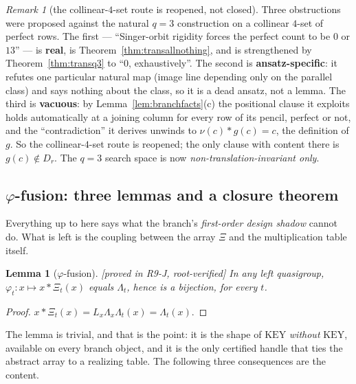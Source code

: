 \documentclass[11pt]{article}
\theoremstyle{plain}
\newtheorem{lemma}[theorem]{Lemma}
\theoremstyle{definition}
\theoremstyle{remark}
\newtheorem*{remark*}{Remark}
\numberwithin{equation}{section}
\newcommand{\op}{\mathbin{*}}
\newcommand{\statusbox}[1]{{\small\sloppy\textsf{[#1]}}}
\newcommand{\PROVED}[1]{\statusbox{proved in #1, root-verified}}
\begin{document}
\begin{remark*}[the collinear-$4$-set route is reopened, not closed]
Three obstructions were proposed against the natural $q = 3$ construction on a
collinear $4$-set of perfect rows. The first --- ``Singer-orbit rigidity forces the
perfect count to be $0$ or $13$'' --- is \textbf{real}, is
Theorem~\ref{thm:transallnothing}, and is strengthened by
Theorem~\ref{thm:transq3} to ``$0$, exhaustively''. The second is
\textbf{ansatz-specific}: it refutes one particular natural map (image line
depending only on the parallel class) and says nothing about the class, so it is a
dead ansatz, not a lemma. The third is \textbf{vacuous}: by
Lemma~\ref{lem:branchfacts}(c) the positional clause it exploits holds
automatically at a joining column for every row of its pencil, perfect or not, and
the ``contradiction'' it derives unwinds to $\nu(c)\op g(c) = c$, the definition of
$g$. So the collinear-$4$-set route is reopened; the only clause with content
there is $g(c)\notin D_r$. The $q = 3$ search space is now
\emph{non-translation-invariant only}.
\end{remark*}

\subsection{$\varphi$-fusion: three lemmas and a closure
theorem}\label{sec:phifusion}

Everything up to here says what the branch's \emph{first-order design shadow}
cannot do. What is left is the coupling between the array $\Xi$ and the
multiplication table itself.

\begin{lemma}[$\varphi$-fusion]\label{lem:phifusion}
\PROVED{R9-J}
In any left quasigroup, $\varphi_t : x\mapsto x\op\Xi_t(x)$ equals $\Lambda_t$,
hence is a bijection, for every $t$.
\end{lemma}

\begin{proof}
$x\op\Xi_t(x) = L_x\Lambda_x\Lambda_t(x) = \Lambda_t(x)$.
\end{proof}

The lemma is trivial, and that is the point: it is the shape of $\mathrm{KEY}$
\emph{without} $\mathrm{KEY}$, available on every branch object, and it is the
only certified handle that ties the abstract array to a realizing table. The
following three consequences are the content.
\end{document}
